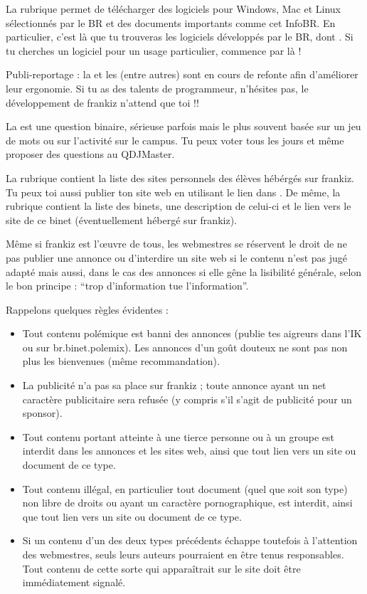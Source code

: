 La rubrique  permet de t\'el\'echarger des logiciels pour Windows, Mac et Linux
s\'electionn\'es par le BR et des documents importants comme cet InfoBR.
En particulier, c'est l\`a que tu trouveras les logiciels d\'evelopp\'es par le BR, dont .
Si tu cherches un logiciel pour un usage particulier, commence par l\`a !

Publi-reportage : la  et les  (entre autres) sont en cours de refonte
afin d'am\'eliorer leur ergonomie.
Si tu as des talents de programmeur, n'h\'esites pas, le d\'eveloppement de frankiz n'attend que toi !!

La  est une question binaire, s\'erieuse parfois mais le plus souvent bas\'ee sur un jeu de mots
ou sur l'activit\'e sur le campus.
Tu peux voter tous les jours et m\^eme proposer des questions au QDJMaster.

La rubrique  contient la liste des sites personnels des \'el\`eves h\'eb\'erg\'es sur frankiz.
Tu peux toi aussi publier ton site web en utilisant le lien dans .
De m\^eme, la rubrique  contient la liste des binets, une description de celui-ci
et le lien vers le site de ce binet (\'eventuellement h\'eberg\'e sur frankiz).

M\^eme si frankiz est l'\oe uvre de tous, les webmestres se r\'eservent le droit de ne pas publier une annonce
ou d'interdire un site web si le contenu n'est pas jug\'e adapt\'e mais aussi,
dans le cas des annonces si elle g\^ene la lisibilit\'e g\'en\'erale, selon le bon principe :
``trop d'information tue l'information''.

Rappelons quelques r\`egles \'evidentes :
\begin{itemize}
 \item Tout contenu pol\'emique est banni des annonces (publie tes aigreurs dans l'IK ou sur br.binet.polemix).
       Les annonces d'un go\^ut douteux ne sont pas non plus les bienvenues (m\^eme recommandation).
 \item La publicit\'e n'a pas sa place sur frankiz ; toute annonce ayant un net caract\`ere publicitaire
       sera refus\'ee (y compris s'il s'agit de publicit\'e pour un sponsor).
 \item Tout contenu portant atteinte \`a une tierce personne ou \`a un groupe est interdit dans les annonces
       et les sites web, ainsi que tout lien vers un site ou document de ce type.
 \item Tout contenu ill\'egal, en particulier tout document (quel que soit son type)
       non libre de droits ou ayant un caract\`ere pornographique, est interdit,
       ainsi que tout lien vers un site ou document de ce type.
 \item Si un contenu d'un des deux types pr\'ec\'edents \'echappe toutefois \`a l'attention des webmestres,
       seuls leurs auteurs pourraient en \^etre tenus responsables.
       Tout contenu de cette sorte qui appara\^itrait sur le site doit \^etre imm\'ediatement signal\'e.
\end{itemize}

